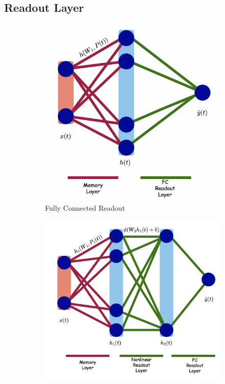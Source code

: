 \documentclass{article}
\begin{document}
\subsection{Readout Layer}

\begin{figure}[h!]
    \centering
    \begin{subfigure}{0.45\textwidth}
        \centering
        \includegraphics[width=\textwidth]{FC}
        \caption{Fully Connected Readout}
        \label{fig:fc}
    \end{subfigure}
    \hfill
    \begin{subfigure}{0.45\textwidth}
        \centering
        \includegraphics[width=\textwidth]{Nonlinear}

\end{subfigure}
\end{figure}
\end{document}
